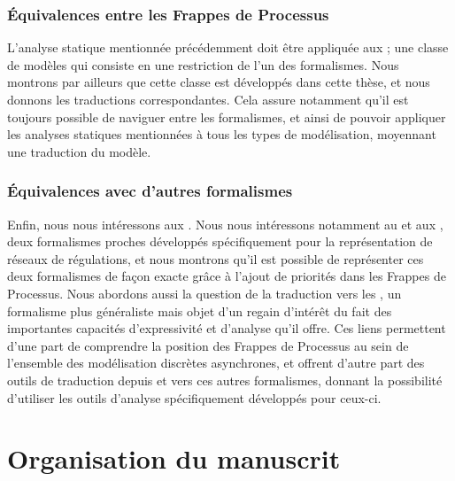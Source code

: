 \subsubsection{Équivalences entre les Frappes de Processus}

L'analyse statique mentionnée précédemment doit être appliquée
aux  ;
une classe de modèles qui consiste en une restriction de l'un des formalismes.
Nous montrons par ailleurs que cette classe est
 développés dans cette thèse,
et nous donnons les traductions correspondantes.
Cela assure notamment qu'il est toujours possible de naviguer entre les formalismes,
et ainsi de pouvoir appliquer les analyses statiques mentionnées à tous les types
de modélisation, moyennant une traduction du modèle.

\subsubsection{Équivalences avec d'autres formalismes}

Enfin, nous nous intéressons aux .
Nous nous intéressons notamment au  et aux ,
deux formalismes proches
développés spécifiquement pour la représentation de réseaux de régulations,
et nous montrons qu'il est possible de représenter ces deux formalismes de façon exacte
grâce à l'ajout de priorités dans les Frappes de Processus.
Nous abordons aussi la question de la traduction vers les ,
un formalisme plus généraliste mais objet d'un regain d'intérêt du fait des importantes
capacités d'expressivité et d'analyse qu'il offre.
Ces liens permettent d'une part de comprendre la position des Frappes de Processus au sein
de l'ensemble des modélisation discrètes asynchrones,
et offrent d'autre part des outils de traduction depuis et vers ces autres formalismes,
donnant la possibilité d'utiliser les outils d'analyse spécifiquement développés pour ceux-ci.



\section{Organisation du manuscrit}

